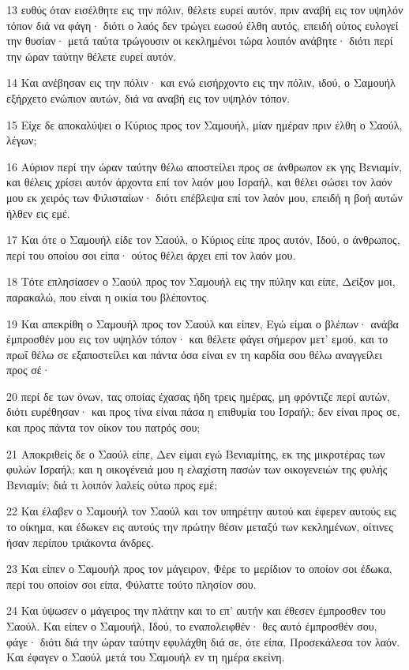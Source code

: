\par 13 ευθύς όταν εισέλθητε εις την πόλιν, θέλετε ευρεί αυτόν, πριν αναβή εις τον υψηλόν τόπον διά να φάγη· διότι ο λαός δεν τρώγει εωσού έλθη αυτός, επειδή ούτος ευλογεί την θυσίαν· μετά ταύτα τρώγουσιν οι κεκλημένοι τώρα λοιπόν ανάβητε· διότι περί την ώραν ταύτην θέλετε ευρεί αυτόν.
\par 14 Και ανέβησαν εις την πόλιν· και ενώ εισήρχοντο εις την πόλιν, ιδού, ο Σαμουήλ εξήρχετο ενώπιον αυτών, διά να αναβή εις τον υψηλόν τόπον.
\par 15 Είχε δε αποκαλύψει ο Κύριος προς τον Σαμουήλ, μίαν ημέραν πριν έλθη ο Σαούλ, λέγων;
\par 16 Αύριον περί την ώραν ταύτην θέλω αποστείλει προς σε άνθρωπον εκ γης Βενιαμίν, και θέλεις χρίσει αυτόν άρχοντα επί τον λαόν μου Ισραήλ, και θέλει σώσει τον λαόν μου εκ χειρός των Φιλισταίων· διότι επέβλεψα επί τον λαόν μου, επειδή η βοή αυτών ήλθεν εις εμέ.
\par 17 Και ότε ο Σαμουήλ είδε τον Σαούλ, ο Κύριος είπε προς αυτόν, Ιδού, ο άνθρωπος, περί του οποίου σοι είπα· ούτος θέλει άρχει επί τον λαόν μου.
\par 18 Τότε επλησίασεν ο Σαούλ προς τον Σαμουήλ εις την πύλην και είπε, Δείξον μοι, παρακαλώ, που είναι η οικία του βλέποντος.
\par 19 Και απεκρίθη ο Σαμουήλ προς τον Σαούλ και είπεν, Εγώ είμαι ο βλέπων· ανάβα έμπροσθέν μου εις τον υψηλόν τόπον· και θέλετε φάγει σήμερον μετ' εμού, και το πρωΐ θέλω σε εξαποστείλει και πάντα όσα είναι εν τη καρδία σου θέλω αναγγείλει προς σέ·
\par 20 περί δε των όνων, τας οποίας έχασας ήδη τρεις ημέρας, μη φρόντιζε περί αυτών, διότι ευρέθησαν· και προς τίνα είναι πάσα η επιθυμία του Ισραήλ; δεν είναι προς σε, και προς πάντα τον οίκον του πατρός σου;
\par 21 Αποκριθείς δε ο Σαούλ είπε, Δεν είμαι εγώ Βενιαμίτης, εκ της μικροτέρας των φυλών Ισραήλ; και η οικογένειά μου η ελαχίστη πασών των οικογενειών της φυλής Βενιαμίν; διά τι λοιπόν λαλείς ούτω προς εμέ;
\par 22 Και έλαβεν ο Σαμουήλ τον Σαούλ και τον υπηρέτην αυτού και έφερεν αυτούς εις το οίκημα, και έδωκεν εις αυτούς την πρώτην θέσιν μεταξύ των κεκλημένων, οίτινες ήσαν περίπου τριάκοντα άνδρες.
\par 23 Και είπεν ο Σαμουήλ προς τον μάγειρον, Φέρε το μερίδιον το οποίον σοι έδωκα, περί του οποίον σοι είπα, Φύλαττε τούτο πλησίον σου.
\par 24 Και ύψωσεν ο μάγειρος την πλάτην και το επ' αυτήν και έθεσεν έμπροσθεν του Σαούλ. Και είπεν ο Σαμουήλ, Ιδού, το εναπολειφθέν· θες αυτό έμπροσθέν σου, φάγε· διότι διά την ώραν ταύτην εφυλάχθη διά σε, ότε είπα, Προσεκάλεσα τον λαόν. Και έφαγεν ο Σαούλ μετά του Σαμουήλ εν τη ημέρα εκείνη.

